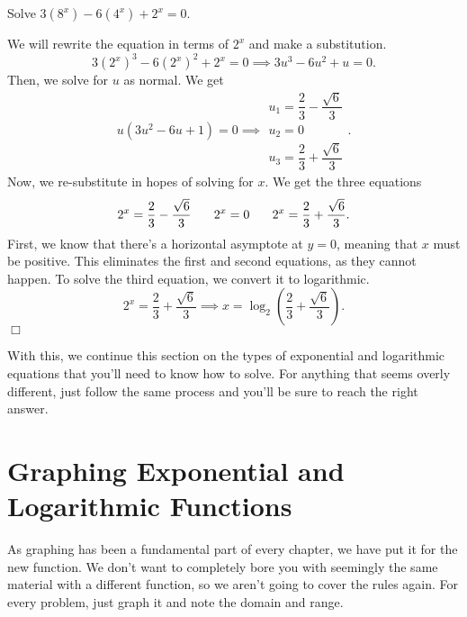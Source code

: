 \documentclass[lang=en,11pt]{elegantbook}
\begin{document}
\begin{example}
Solve $3(8^x)-6(4^x)+2^x=0$.
\end{example}
\begin{solution}
We will rewrite the equation in terms of $2^x$ and make a substitution.  $$3(2^x)^3-6(2^x)^2+2^x=0 \implies 3u^3-6u^2+u=0.$$  Then, we solve for $u$ as normal.  We get $$u(3u^2-6u+1)=0 \implies \begin{matrix} u_1=\dfrac{2}{3}-\dfrac{\sqrt{6}}{3} \\ u_2=0 \\ u_3=\dfrac{2}{3}+\dfrac{\sqrt{6}}{3} \end{matrix}.$$
Now, we re-substitute in hopes of solving for $x$. We get the three equations $$2^x=\dfrac{2}{3}-\dfrac{\sqrt{6}}{3} \hspace{0.25in} 2^x=0 \hspace{0.25in} 2^x=\dfrac{2}{3}+\dfrac{\sqrt{6}}{3}.$$
First, we know that there's a horizontal asymptote at $y=0$, meaning that $x$ must be positive.  This eliminates the first and second equations, as they cannot happen.  To solve the third equation, we convert it to logarithmic.  $$2^x=\dfrac{2}{3}+\dfrac{\sqrt{6}}{3} \implies x=\log_2\left(\dfrac{2}{3}+\dfrac{\sqrt{6}}{3}\right).$$ $\Box$
\end{solution}
With this, we continue this section on the types of exponential and logarithmic equations that you'll need to know how to solve.  For anything that seems overly different, just follow the same process and you'll be sure to reach the right answer.
\section{Graphing Exponential and Logarithmic Functions}
\noindent As graphing has been a fundamental part of every chapter, we have put it for the new function.  We don't want to completely bore you with seemingly the same material with a different function, so we aren't going to cover the rules again.  For every problem, just graph it and note the domain and range.
\end{document}
